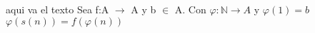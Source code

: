 \documentclass[12pt]{article}
\begin{document}
aqui va el texto
Sea f:A \( \rightarrow \) A y b \(\in \) A. Con \(\varphi:  \mathbb{N} \rightarrow A\) y \(\varphi(1) = b\)
\( \varphi(s(n)) = f(\varphi(n))\)
\end{document}
